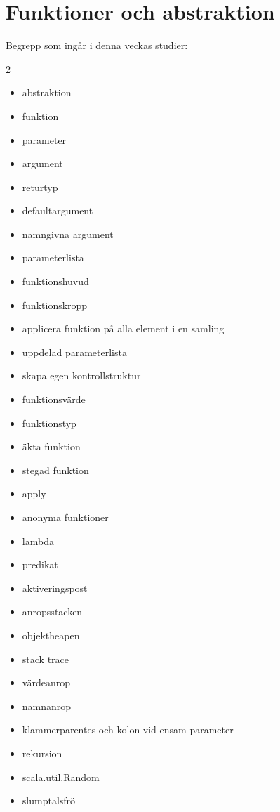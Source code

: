 \chapter{Funktioner och abstraktion}\label{chapter:W03}
Begrepp som ingår i denna veckas studier:
\begin{multicols}{2}\begin{itemize}[noitemsep,label={$\square$},leftmargin=*]
\item abstraktion
\item funktion
\item parameter
\item argument
\item returtyp
\item defaultargument
\item namngivna argument
\item parameterlista
\item funktionshuvud
\item funktionskropp
\item applicera funktion på alla element i en samling
\item uppdelad parameterlista
\item skapa egen kontrollstruktur
\item funktionsvärde
\item funktionstyp
\item äkta funktion
\item stegad funktion
\item apply
\item anonyma funktioner
\item lambda
\item predikat
\item aktiveringspost
\item anropsstacken
\item objektheapen
\item stack trace
\item värdeanrop
\item namnanrop
\item klammerparentes och kolon vid ensam parameter
\item rekursion
\item scala.util.Random
\item slumptalsfrö\end{itemize}\end{multicols}
